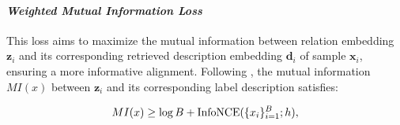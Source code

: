 


\paragraph{\textit{Weighted Mutual Information Loss}}
This loss aims to maximize the mutual information between relation embedding $\bm{z}_i$ and its corresponding retrieved description embedding $\bm{d}_i$ of sample $\bm{x}_i$, ensuring a more informative alignment. Following \citet{DBLP:journals/corr/abs-1807-03748}, the mutual information $MI(x)$ between $\bm{z}_i$ and its corresponding label description satisfies:


\begin{equation}
    MI(x) \geq \log B + \textnormal{InfoNCE} (\{ x_i\}_{i=1}^B; h),
\end{equation}

